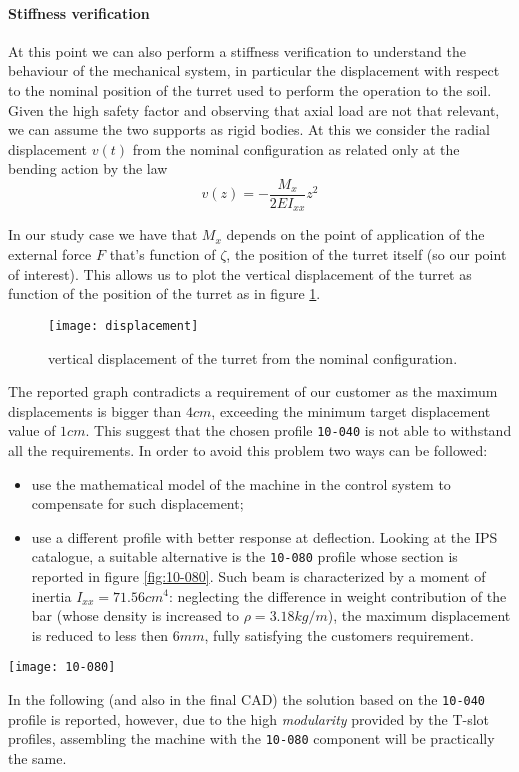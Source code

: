 	\paragraph{Stiffness verification} At this point we can also perform a stiffness verification to understand the behaviour of the mechanical system, in particular the displacement with respect to the nominal position of the turret used to perform the operation to the soil. Given the high safety factor and observing that axial load are not that relevant, we can assume the two supports as rigid bodies. At this we consider the radial displacement $v(t)$ from the nominal configuration as related only at the bending action by the law
	\[ v(z) = - \frac{M_x}{2EI_{xx}}z^2 \]
	
	In our study case we have that $M_x$ depends on the point of application of the external force $F$ that's function of $\zeta$, the position of the turret itself (so our point of interest). This allows us to plot the vertical displacement of the turret as function of the position of the turret as in figure \ref{fig:displacement}. 
	\begin{figure}[tb]
		\centering \texttt{[image: displacement]}
		\caption{vertical displacement of the turret from the nominal configuration.} \label{fig:displacement}
	\end{figure}

	The reported graph contradicts a requirement of our customer as the maximum displacements is bigger than $4cm$, exceeding the minimum target displacement value of $1cm$. This suggest that the chosen profile \texttt{10-040} is not able to withstand all the requirements. In order to avoid this problem two ways can be followed:
	\begin{itemize}
		\item use the mathematical model of the machine in the control system to compensate for such displacement;
		\item use a different profile with better response at deflection. Looking at the IPS catalogue, a suitable alternative is the \texttt{10-080} profile whose section is reported in figure \ref{fig:10-080}. Such beam is characterized by a moment of inertia $I_{xx} = 71.56cm^4$: neglecting the difference in weight contribution of the bar (whose density is increased to $\rho = 3.18kg/m$),  the maximum displacement is reduced to less then $6mm$, fully satisfying the customers requirement.
	\end{itemize}
	\begin{SCfigure}[3][bht]
		\centering
		\texttt{[image: 10-080]}
		\caption{section of the \texttt{10-080} T-slot profile by Parker IPS\cite{parker-ds}.}
		\label{fig:10-080}
	\end{SCfigure}
	
	In the following (and also in the final CAD) the solution based on the \texttt{10-040} profile is reported, however, due to the high \textit{modularity} provided by the T-slot profiles, assembling the machine with the \texttt{10-080} component will be practically the same.
	
	
